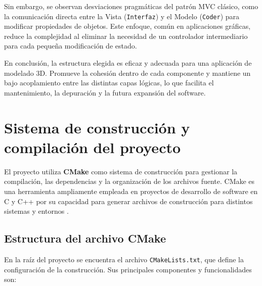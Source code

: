 Sin embargo, se observan desviaciones pragmáticas del patrón MVC clásico, como
la comunicación directa entre la Vista (\texttt{Interfaz}) y el Modelo
(\texttt{Coder}) para modificar propiedades de objetos. Este enfoque, común en
aplicaciones gráficas, reduce la complejidad al eliminar la necesidad de un
controlador intermediario para cada pequeña modificación de estado.

En conclusión, la estructura elegida es eficaz y adecuada para una aplicación
de modelado 3D. Promueve la cohesión dentro de cada componente y mantiene un
bajo acoplamiento entre las distintas capas lógicas, lo que facilita el
mantenimiento, la depuración y la futura expansión del software.

\section{Sistema de construcción y compilación del proyecto}

El proyecto utiliza \textbf{CMake} como sistema de construcción para gestionar
la compilación, las dependencias y la organización de los archivos fuente.
CMake es una herramienta ampliamente empleada en proyectos de desarrollo de
software en C y C++ por su capacidad para generar archivos de construcción para
distintos sistemas y entornos \cite{cmake-docs}.

\subsection{Estructura del archivo CMake}

En la raíz del proyecto se encuentra el archivo \texttt{CMakeLists.txt}, que
define la configuración de la construcción. Sus principales componentes y
funcionalidades son:

